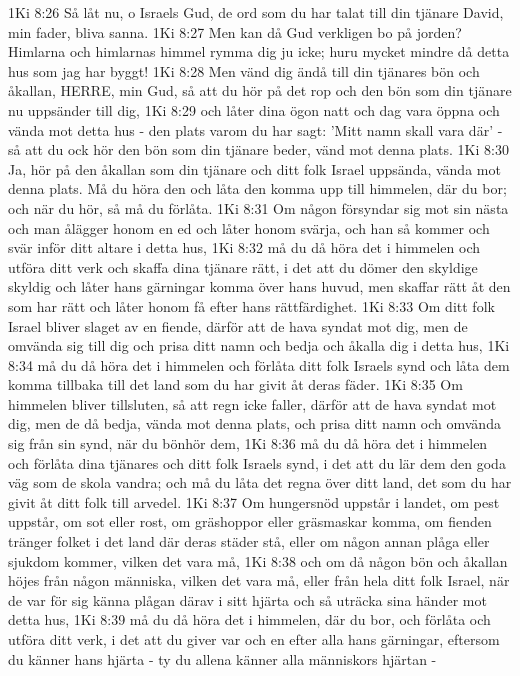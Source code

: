 1Ki 8:26  Så låt nu, o Israels Gud, de ord som du har talat till din tjänare David, min fader, bliva sanna.
1Ki 8:27  Men kan då Gud verkligen bo på jorden? Himlarna och himlarnas himmel rymma dig ju icke; huru mycket mindre då detta hus som jag har byggt!
1Ki 8:28  Men vänd dig ändå till din tjänares bön och åkallan, HERRE, min Gud, så att du hör på det rop och den bön som din tjänare nu uppsänder till dig,
1Ki 8:29  och låter dina ögon natt och dag vara öppna och vända mot detta hus - den plats varom du har sagt: 'Mitt namn skall vara där' - så att du ock hör den bön som din tjänare beder, vänd mot denna plats.
1Ki 8:30  Ja, hör på den åkallan som din tjänare och ditt folk Israel uppsända, vända mot denna plats. Må du höra den och låta den komma upp till himmelen, där du bor; och när du hör, så må du förlåta.
1Ki 8:31  Om någon försyndar sig mot sin nästa och man ålägger honom en ed och låter honom svärja, och han så kommer och svär inför ditt altare i detta hus,
1Ki 8:32  må du då höra det i himmelen och utföra ditt verk och skaffa dina tjänare rätt, i det att du dömer den skyldige skyldig och låter hans gärningar komma över hans huvud, men skaffar rätt åt den som har rätt och låter honom få efter hans rättfärdighet.
1Ki 8:33  Om ditt folk Israel bliver slaget av en fiende, därför att de hava syndat mot dig, men de omvända sig till dig och prisa ditt namn och bedja och åkalla dig i detta hus,
1Ki 8:34  må du då höra det i himmelen och förlåta ditt folk Israels synd och låta dem komma tillbaka till det land som du har givit åt deras fäder.
1Ki 8:35  Om himmelen bliver tillsluten, så att regn icke faller, därför att de hava syndat mot dig, men de då bedja, vända mot denna plats, och prisa ditt namn och omvända sig från sin synd, när du bönhör dem,
1Ki 8:36  må du då höra det i himmelen och förlåta dina tjänares och ditt folk Israels synd, i det att du lär dem den goda väg som de skola vandra; och må du låta det regna över ditt land, det som du har givit åt ditt folk till arvedel.
1Ki 8:37  Om hungersnöd uppstår i landet, om pest uppstår, om sot eller rost, om gräshoppor eller gräsmaskar komma, om fienden tränger folket i det land där deras städer stå, eller om någon annan plåga eller sjukdom kommer, vilken det vara må,
1Ki 8:38  och om då någon bön och åkallan höjes från någon människa, vilken det vara må, eller från hela ditt folk Israel, när de var för sig känna plågan därav i sitt hjärta och så uträcka sina händer mot detta hus,
1Ki 8:39  må du då höra det i himmelen, där du bor, och förlåta och utföra ditt verk, i det att du giver var och en efter alla hans gärningar, eftersom du känner hans hjärta - ty du allena känner alla människors hjärtan -

